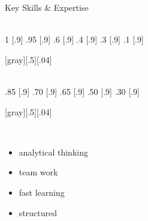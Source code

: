 \begin{frame}[t]{Key Skills \& Expertise}
%
  \vspace*{5mm}
  \begin{minipage}[c][.7\textheight][t]{.29\textwidth}\centering
    \\[2ex]
     {1}   [.9\textwidth]\sg
         {.95} [.9\textwidth]\sg
         {.6}  [.9\textwidth]\sg
         {.4}  [.9\textwidth]\sg
         {.3}  [.9\textwidth]\sg
         {.1}  [.9\textwidth]
  \end{minipage}[gray][.5][.04]
%
  \begin{minipage}[c][.7\textheight][t]{.3\textwidth}\centering
    \\[4.3ex]
              {.85} [.9\textwidth]\skg
               {.70} [.9\textwidth]\skg
                 {.65} [.9\textwidth]\skg
             {.50} [.9\textwidth]\skg
                  {.30} [.9\textwidth]
  \end{minipage}[gray][.5][.04]
%
  \begin{minipage}[c][.7\textheight][t]{.3\textwidth}\centering
    \\[2ex]
    \begin{itemize}
      \item analytical thinking\mg
      \item team work\mg
      \item fast learning\mg
      \item structured\mg
    \end{itemize}
  \end{minipage}
%
\end{frame}
